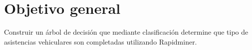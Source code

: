 \section{Objetivo general}
Construir un \'arbol de decisi\'on que mediante clasificaci\'on determine que tipo de asistencias
vehiculares son completadas utilizando Rapidminer.

